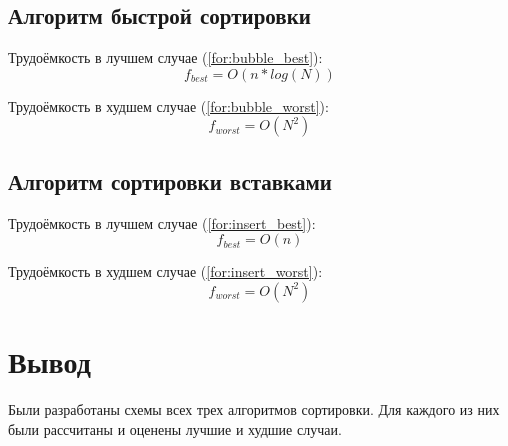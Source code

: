 \subsection{Алгоритм быстрой сортировки}

Трудоёмкость в лучшем случае (\ref{for:bubble_best}):
\begin{equation}
    \label{for:bubble_best}
    f_{best} = O(n * log(N))
\end{equation}

Трудоёмкость в худшем случае (\ref{for:bubble_worst}):
\begin{equation}
    \label{for:bubble_worst}
    f_{worst} = O(N^2)
\end{equation}



\subsection{Алгоритм сортировки вставками}

Трудоёмкость в лучшем случае (\ref{for:insert_best}):
\begin{equation}
    \label{for:insert_best}
    f_{best} = O(n)
\end{equation}

Трудоёмкость в худшем случае (\ref{for:insert_worst}):
\begin{equation}
    \label{for:insert_worst}
    f_{worst} = O(N^2)
\end{equation}

\section*{Вывод}

Были разработаны схемы всех трех алгоритмов сортировки.
Для каждого из них были рассчитаны и оценены лучшие и худшие случаи.
